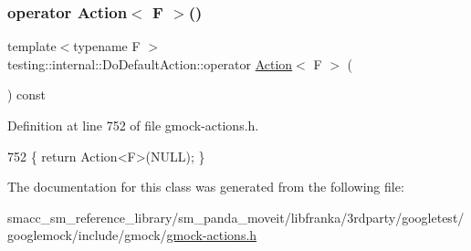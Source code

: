\subsubsection{\texorpdfstring{operator Action$<$ F $>$()}{operator Action< F >()}}
{\footnotesize\ttfamily template$<$typename F $>$ \\
testing\+::internal\+::\+Do\+Default\+Action\+::operator \hyperlink{classtesting_1_1Action}{Action}$<$ F $>$ (\begin{DoxyParamCaption}{ }\end{DoxyParamCaption}) const\hspace{0.3cm}{\ttfamily [inline]}}



Definition at line 752 of file gmock-\/actions.\+h.


\begin{DoxyCode}
752 \{ \textcolor{keywordflow}{return} Action<F>(NULL); \}
\end{DoxyCode}


The documentation for this class was generated from the following file\+:\begin{DoxyCompactItemize}
\item 
smacc\+\_\+sm\+\_\+reference\+\_\+library/sm\+\_\+panda\+\_\+moveit/libfranka/3rdparty/googletest/googlemock/include/gmock/\hyperlink{gmock-actions_8h}{gmock-\/actions.\+h}\end{DoxyCompactItemize}
